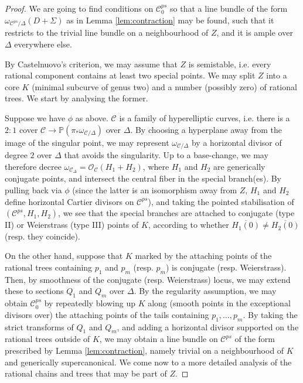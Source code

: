 \documentclass[11pt]{amsart}
\newcommand{\PP}{\mathbb P}
\newcommand{\OO}{\mathcal O}
\renewcommand{\to}{\rightarrow}
\newcommand{\dvr}{\Delta}
\theoremstyle{plain}
\theoremstyle{definition}
\begin{document}
\begin{proof}
 We are going to find conditions on $\mathcal C^{ps}_0$ so that a line bundle of the form $\omega_{\mathcal C^{ps}/\dvr}(D+\Sigma)$ as in Lemma \ref{lem:contraction} may be found, such that it restricts to the trivial line bundle on a neighbourhood of $Z$, and it is ample over $\dvr$ everywhere else.
 
 By Castelnuovo's criterion, we may assume that $Z$ is semistable, i.e. every rational component contains at least two special points. We may split $Z$ into a core $K$ (minimal subcurve of genus two) and a number (possibly zero) of rational trees. We start by analysing the former.
 
 Suppose we have $\phi$ as above. $\mathcal C$ is a family of hyperelliptic curves, i.e. there is a $2:1$ cover $\mathcal C\to \PP(\pi_*\omega_{\mathcal C/\dvr})$ over $\dvr$. By choosing a hyperplane away from the image of the singular point, we may represent $\omega_{\mathcal C/\dvr}$ by a horizontal divisor of degree $2$ over $\dvr$ that avoids the singularity. Up to a base-change, we may therefore decree $\omega_{\mathcal C_\dvr}=\OO_{\mathcal C}(H_1+H_2)$, where $H_1$ and $H_2$ are generically conjugate points, and intersect the central fiber in the special branch(es). By pulling back via $\phi$ (since the latter is an isomorphism away from $Z$, $H_1$ and $H_2$ define horizontal Cartier divisors on $\mathcal C^{ps}$), and taking the pointed stabilisation of $(\mathcal C^{ps},H_1,H_2)$, we see that the special branches are attached to conjugate (type II) or Weierstrass (type III) points of $K$, according to whether $\overline{H_1(0)}\neq\overline{H_2(0)}$ (resp. they coincide).
 
 On the other hand, suppose that $K$ marked by the attaching points of the rational trees containing $p_1$ and $p_m$ (resp. $p_m$) is conjugate (resp. Weierstrass). Then, by smoothness of the conjugate (resp. Weierstrass) locus, we may extend these to sections $Q_1$ and $Q_m$ over $\dvr$. By the regularity assumption, we may obtain $\mathcal C^{ps}_0$ by repeatedly blowing up $K$ along (smooth points in the exceptional divisors over) the attaching points of the tails containing $p_1,\ldots,p_m$. By taking the strict transforms of $Q_1$ and $Q_m$, and adding a horizontal divisor supported on the rational trees outside of $K$, we may obtain a line bundle on $\mathcal C^{ps}$ of the form prescribed by Lemma \ref{lem:contraction}, namely trivial on a neighbourhood of $K$ and generically supercanonical. We come now to a more detailed analysis of the rational chains and trees that may be part of $Z$.
 

\end{proof}
\end{document}
